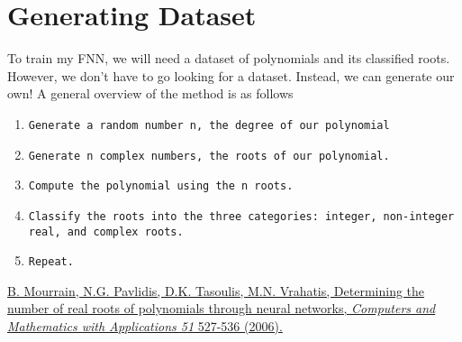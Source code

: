 \documentclass{article}
\begin{document}
\section{Generating Dataset}
To train my FNN, we will need a dataset of polynomials and its classified roots. However, we don't have to go looking for a dataset. Instead, we can generate our own! A general overview of the method is as follows
\begin{enumerate}
\item \begin{verbatim}Generate a random number n, the degree of our polynomial\end{verbatim}
\item \begin{verbatim}Generate n complex numbers, the roots of our polynomial.\end{verbatim}
\item \begin{verbatim}Compute the polynomial using the n roots.\end{verbatim}
\item \begin{verbatim}Classify the roots into the three categories: integer, non-integer real, and complex roots.\end{verbatim}
\item \begin{verbatim}Repeat.\end{verbatim}
\end{enumerate}

\begin{thebibliography}{999}
\href{https://www.sciencedirect.com/science/article/pii/S0898122105005195}{B. Mourrain, N.G. Pavlidis, D.K. Tasoulis, M.N. Vrahatis, Determining the number of real roots of polynomials through neural networks, \textit{Computers and
Mathematics with Applications 51} 527-536 (2006).}
\end{thebibliography}
\end{document}
